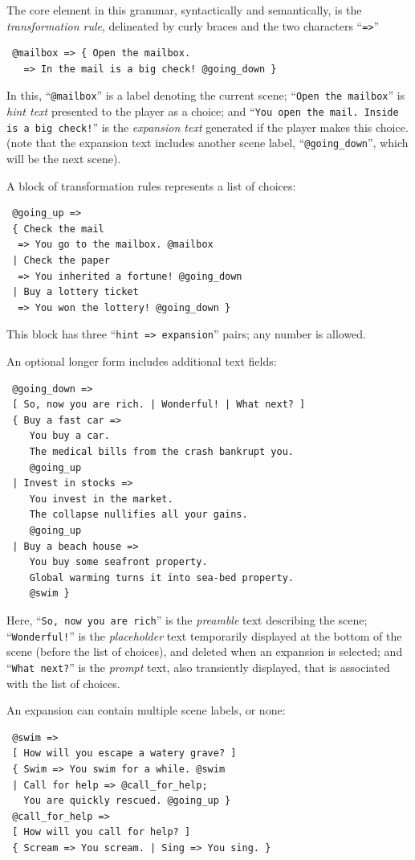 \documentclass{acm_proc_article-sp}
\begin{document}
The core element in this grammar, syntactically and semantically, is the {\em transformation rule},
delineated by curly braces and the two characters ``{\tt =>}''
\begin{verbatim}
 @mailbox => { Open the mailbox.
   => In the mail is a big check! @going_down }
\end{verbatim}
In this, ``{\tt @mailbox}'' is a label denoting the current scene;
``{\tt Open the mailbox}'' is {\em hint text} presented to the player as a choice;
and ``{\tt You open the mail. Inside is a big check!}''
 is the {\em expansion text} generated if the player makes this choice.
 (note that the expansion text includes another scene label, ``{\tt @going\_down}'',
  which will be the next scene).

A block of transformation rules represents a list of choices:
\begin{verbatim}
 @going_up =>
 { Check the mail
  => You go to the mailbox. @mailbox
 | Check the paper
  => You inherited a fortune! @going_down
 | Buy a lottery ticket
  => You won the lottery! @going_down }
\end{verbatim}
This block has three ``{\tt hint => expansion}'' pairs; any number is allowed.

An optional longer form includes additional text fields:
\begin{verbatim}
 @going_down =>
 [ So, now you are rich. | Wonderful! | What next? ]
 { Buy a fast car =>
    You buy a car.
    The medical bills from the crash bankrupt you.
    @going_up
 | Invest in stocks =>
    You invest in the market.
    The collapse nullifies all your gains.
    @going_up
 | Buy a beach house =>
    You buy some seafront property.
    Global warming turns it into sea-bed property.
    @swim }
\end{verbatim}

Here, ``{\tt So, now you are rich}'' is the {\em preamble} text describing the scene;
``{\tt Wonderful!}'' is the {\em placeholder} text temporarily displayed at the bottom of the scene (before the list of choices),
and deleted when an expansion is selected;
and ``{\tt What next?}'' is the {\em prompt} text, also transiently displayed, that is associated with the list of choices.

An expansion can contain multiple scene labels, or none:
\begin{verbatim}
 @swim =>
 [ How will you escape a watery grave? ]
 { Swim => You swim for a while. @swim
 | Call for help => @call_for_help;
   You are quickly rescued. @going_up }
 @call_for_help =>
 [ How will you call for help? ]
 { Scream => You scream. | Sing => You sing. }
\end{verbatim}
\end{document}
